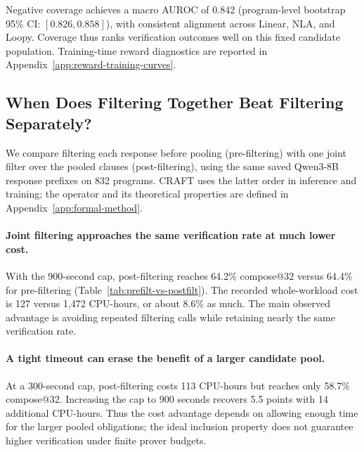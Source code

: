 Negative coverage achieves a macro AUROC of 0.842 (program-level bootstrap
95\% CI: \([0.826,0.858]\)), with consistent alignment across Linear, NLA,
and Loopy. Coverage thus ranks verification outcomes well on this fixed
candidate population. Training-time reward diagnostics are reported in
Appendix~\ref{app:reward-training-curves}.



\subsection{When Does Filtering Together Beat Filtering Separately?}

\label{app:houdini-order}

We compare filtering each response before pooling (pre-filtering) with
one joint filter over the pooled clauses (post-filtering), using the same
saved Qwen3-8B response prefixes on 832 programs.  CRAFT uses the latter
order in inference and training; the operator and its theoretical properties
are defined in Appendix~\ref{app:formal-method}.

\paragraph{Joint filtering approaches the same verification rate at much lower cost.}
With the 900-second cap, post-filtering reaches 64.2\% compose@32 versus
64.4\% for pre-filtering (Table~\ref{tab:prefilt-vs-postfilt}).  The recorded
whole-workload cost is 127 versus 1,472 CPU-hours, or about 8.6\% as much.
The main observed advantage is avoiding repeated
filtering calls while retaining nearly the same verification rate.

\paragraph{A tight timeout can erase the benefit of a larger candidate pool.}
At a 300-second cap, post-filtering costs 113 CPU-hours but reaches only
58.7\% compose@32.  Increasing the cap to 900 seconds recovers 5.5 points
with 14 additional CPU-hours.  Thus the cost advantage depends on allowing
enough time for the larger pooled obligations; the ideal inclusion property
does not guarantee higher verification under finite prover budgets.

